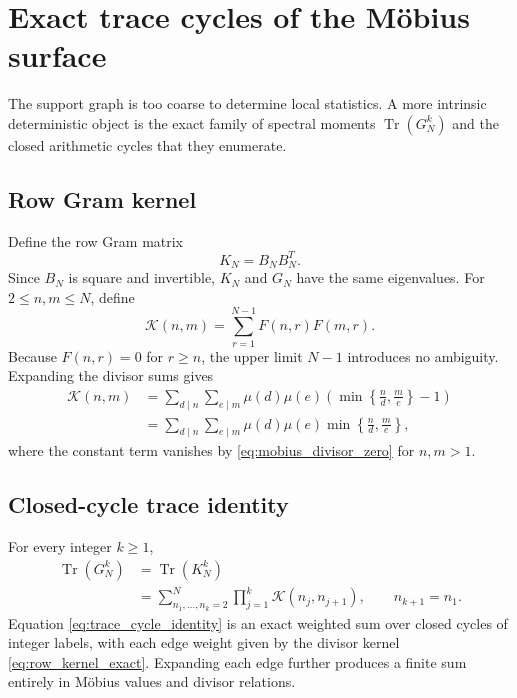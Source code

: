\documentclass[11pt]{amsart}
\numberwithin{equation}{section}
\theoremstyle{plain}
\theoremstyle{definition}
\theoremstyle{remark}
\newcommand{\mob}{\mu}
\newcommand{\Tr}{\operatorname{Tr}}
\begin{document}
\section{Exact trace cycles of the M\"obius surface}
\label{sec:trace_cycles}

The support graph is too coarse to determine local statistics.  A more intrinsic deterministic object is the exact family of spectral moments $\Tr(G_N^k)$ and the closed arithmetic cycles that they enumerate.

\subsection{Row Gram kernel}
\label{subsec:row_gram_kernel}

Define the row Gram matrix
\begin{equation}
K_N=B_NB_N^T.
\label{eq:row_gram}
\end{equation}
Since $B_N$ is square and invertible, $K_N$ and $G_N$ have the same eigenvalues.  For $2\le n,m\le N$, define
\begin{equation}
\mathcal K(n,m)=\sum_{r=1}^{N-1}F(n,r)F(m,r).
\label{eq:row_kernel_definition}
\end{equation}
Because $F(n,r)=0$ for $r\ge n$, the upper limit $N-1$ introduces no ambiguity.  Expanding the divisor sums gives
\begin{align}
\mathcal K(n,m)
&=
\sum_{d\mid n}\sum_{e\mid m}
\mob(d)\mob(e)
\left(\min\left\{\frac nd,\frac me\right\}-1\right)
\label{eq:row_kernel_with_constant}\\
&=
\sum_{d\mid n}\sum_{e\mid m}
\mob(d)\mob(e)
\min\left\{\frac nd,\frac me\right\},
\label{eq:row_kernel_exact}
\end{align}
where the constant term vanishes by \eqref{eq:mobius_divisor_zero} for $n,m>1$.

\subsection{Closed-cycle trace identity}
\label{subsec:closed_cycle_trace}

For every integer $k\ge1$,
\begin{align}
\Tr(G_N^k)
&=\Tr(K_N^k)
\label{eq:trace_gram_equality}\\
&=
\sum_{n_1,\ldots,n_k=2}^{N}
\prod_{j=1}^{k}
\mathcal K(n_j,n_{j+1}),
\qquad n_{k+1}=n_1.
\label{eq:trace_cycle_identity}
\end{align}
Equation \eqref{eq:trace_cycle_identity} is an exact weighted sum over closed cycles of integer labels, with each edge weight given by the divisor kernel \eqref{eq:row_kernel_exact}.  Expanding each edge further produces a finite sum entirely in M\"obius values and divisor relations.
\end{document}
